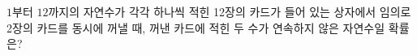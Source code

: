 $1$부터 $12$까지의 자연수가 각각 하나씩 적힌 12장의 카드가 들어 있는 상자에서 임의로 2장의 카드를 동시에 꺼낼 때, 꺼낸 카드에 적힌 두 수가 연속하지 않은 자연수일 확률은?
